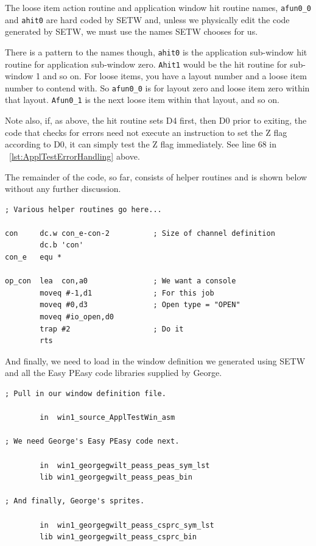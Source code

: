 \begin{note}
The loose item action routine and application window hit routine
      names, \texttt{afun0\_0} and \texttt{ahit0} are hard coded by
 SETW and, unless we physically edit the code
      generated by SETW, we must use the names
 SETW chooses for us.

There is a pattern to the names though, \texttt{ahit0} is the application
      sub-{}window hit routine for application sub-{}window zero. \texttt{Ahit1} would be
      the hit routine for sub-{}window 1 and so on. For loose items, you have a
      layout number and a loose item number to contend with. So \texttt{afun0\_0} is for
      layout zero and loose item zero within that layout. \texttt{Afun0\_1} is the next
      loose item within that layout, and so on.

Note also, if, as above, the hit routine sets D4 first, then D0 prior to exiting, the code that checks for errors need not execute an instruction to set the Z flag according to D0, it can simply test the Z flag immediately. See line 68 in \lstlistingname~\ref{lst:ApplTestErrorHandling} above.
\end{note}

The remainder of the code, so far, consists of helper routines and
    is shown below without any further discussion.

\begin{lstlisting}[firstnumber=last,caption={ApplTest\_asm - Console Handling}]
; Various helper routines go here...

con     dc.w con_e-con-2          ; Size of channel definition
        dc.b 'con'
con_e   equ *

op_con  lea  con,a0               ; We want a console
        moveq #-1,d1              ; For this job
        moveq #0,d3               ; Open type = "OPEN"
        moveq #io_open,d0
        trap #2                   ; Do it
        rts
\end{lstlisting}

And finally, we need to load in the window definition we generated
    using SETW and all the Easy
    PEasy code libraries supplied by George.

\begin{lstlisting}[firstnumber=last,caption={ApplTest\_asm - Incorporating the EasyPEasy Library}]
; Pull in our window definition file.

        in  win1_source_ApplTestWin_asm

; We need George's Easy PEasy code next.

        in  win1_georgegwilt_peass_peas_sym_lst
        lib win1_georgegwilt_peass_peas_bin

; And finally, George's sprites.

        in  win1_georgegwilt_peass_csprc_sym_lst
        lib win1_georgegwilt_peass_csprc_bin
\end{lstlisting}


